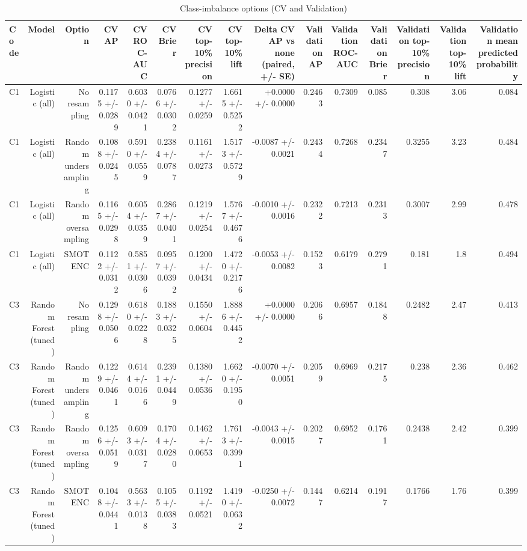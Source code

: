 \begin{table}[htbp]
\centering
\small
\caption{Class-imbalance options (CV and Validation)}
\begin{tabular}{lrrrrrrrrrrrrrr}
\toprule
Code & Model & Option & CV AP & CV ROC-AUC & CV Brier & CV top-10\% precision & CV top-10\% lift & Delta CV AP vs none (paired, +/- SE) & Validation AP & Validation ROC-AUC & Validation Brier & Validation top-10\% precision & Validation top-10\% lift & Validation mean predicted probability \\
\midrule
C1 & Logistic (all) & No resampling & 0.1175 +/- 0.0289 & 0.6030 +/- 0.0421 & 0.0766 +/- 0.0302 & 0.1277 +/- 0.0259 & 1.6615 +/- 0.5252 & +0.0000 +/- 0.0000 & 0.2463 & 0.7309 & 0.085 & 0.308 & 3.06 & 0.084 \\
C1 & Logistic (all) & Random undersampling & 0.1088 +/- 0.0245 & 0.5910 +/- 0.0559 & 0.2384 +/- 0.0787 & 0.1161 +/- 0.0273 & 1.5173 +/- 0.5729 & -0.0087 +/- 0.0021 & 0.2434 & 0.7268 & 0.2347 & 0.3255 & 3.23 & 0.484 \\
C1 & Logistic (all) & Random oversampling & 0.1165 +/- 0.0298 & 0.6054 +/- 0.0359 & 0.2867 +/- 0.0401 & 0.1219 +/- 0.0254 & 1.5767 +/- 0.4676 & -0.0010 +/- 0.0016 & 0.2322 & 0.7213 & 0.2313 & 0.3007 & 2.99 & 0.478 \\
C1 & Logistic (all) & SMOTENC & 0.1122 +/- 0.0312 & 0.5851 +/- 0.0306 & 0.0957 +/- 0.0392 & 0.1200 +/- 0.0434 & 1.4720 +/- 0.2176 & -0.0053 +/- 0.0082 & 0.1523 & 0.6179 & 0.2791 & 0.181 & 1.8 & 0.494 \\
C3 & Random Forest (tuned) & No resampling & 0.1298 +/- 0.0506 & 0.6180 +/- 0.0228 & 0.1883 +/- 0.0325 & 0.1550 +/- 0.0604 & 1.8886 +/- 0.4452 & +0.0000 +/- 0.0000 & 0.2066 & 0.6957 & 0.1848 & 0.2482 & 2.47 & 0.413 \\
C3 & Random Forest (tuned) & Random undersampling & 0.1229 +/- 0.0461 & 0.6144 +/- 0.0166 & 0.2391 +/- 0.0449 & 0.1380 +/- 0.0536 & 1.6620 +/- 0.1950 & -0.0070 +/- 0.0051 & 0.2059 & 0.6969 & 0.2175 & 0.238 & 2.36 & 0.462 \\
C3 & Random Forest (tuned) & Random oversampling & 0.1256 +/- 0.0519 & 0.6093 +/- 0.0317 & 0.1704 +/- 0.0280 & 0.1462 +/- 0.0653 & 1.7613 +/- 0.3991 & -0.0043 +/- 0.0015 & 0.2027 & 0.6952 & 0.1761 & 0.2438 & 2.42 & 0.399 \\
C3 & Random Forest (tuned) & SMOTENC & 0.1048 +/- 0.0441 & 0.5633 +/- 0.0138 & 0.1055 +/- 0.0383 & 0.1192 +/- 0.0521 & 1.4190 +/- 0.0632 & -0.0250 +/- 0.0072 & 0.1447 & 0.6214 & 0.1917 & 0.1766 & 1.76 & 0.399 \\
\bottomrule
\end{tabular}
\par\smallskip\begin{minipage}{\linewidth}\footnotesize \end{minipage}
\end{table}


